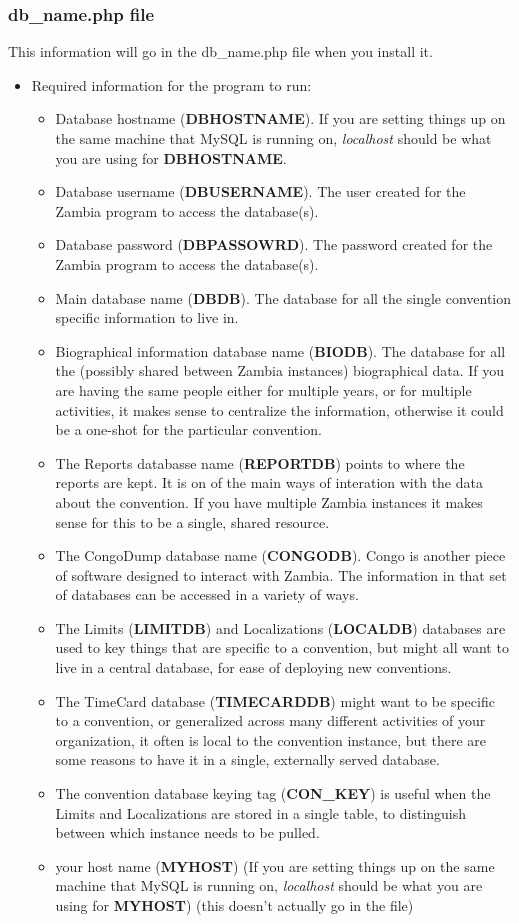 \documentclass[captions=tablesignature]{scrartcl}
\begin{document}
\subsubsection{db\_name.php file}
\label{sec-1-2-4}
This information will go in the db\_name.php file when you install it.
\begin{itemize}
\item Required information for the program to run:
\label{sec-1-2-4-1}
\begin{itemize}
\item Database hostname (\textbf{DBHOSTNAME}). If you are setting things up on
the same machine that MySQL is running on, \emph{localhost} should be
what you are using for \textbf{DBHOSTNAME}.
\item Database username (\textbf{DBUSERNAME}).  The user created for the
Zambia program to access the database(s).
\item Database password (\textbf{DBPASSOWRD}).  The password created for the
Zambia program to access the database(s).
\item Main database name (\textbf{DBDB}).  The database for all the single
convention specific information to live in.
\item Biographical information database name (\textbf{BIODB}).  The database
for all the (possibly shared between Zambia instances)
biographical data.  If you are having the same people either for
multiple years, or for multiple activities, it makes sense to
centralize the information, otherwise it could be a one-shot for
the particular convention.
\item The Reports databasse name (\textbf{REPORTDB}) points to where the
reports are kept.  It is on of the main ways of interation with
the data about the convention.  If you have multiple Zambia
instances it makes sense for this to be a single, shared
resource.
\item The CongoDump database name (\textbf{CONGODB}). Congo is another piece of
software designed to interact with Zambia. The information in
that set of databases can be accessed in a variety of ways.
\item The Limits (\textbf{LIMITDB}) and Localizations (\textbf{LOCALDB}) databases
are used to key things that are specific to a convention, but
might all want to live in a central database, for ease of
deploying new conventions.
\item The TimeCard database (\textbf{TIMECARDDB}) might want to be specific to
a convention, or generalized across many different activities of
your organization, it often is local to the convention instance,
but there are some reasons to have it in a single, externally
served database.
\item The convention database keying tag (\textbf{CON\_KEY}) is useful when the
Limits and Localizations are stored in a single table, to
distinguish between which instance needs to be pulled.
\item your host name (\textbf{MYHOST}) (If you are setting things up on the same
machine that MySQL is running on, \emph{localhost} should be what you
are using for \textbf{MYHOST}) (this doesn't actually go in the file)
\end{itemize}


\end{itemize}
\end{document}
